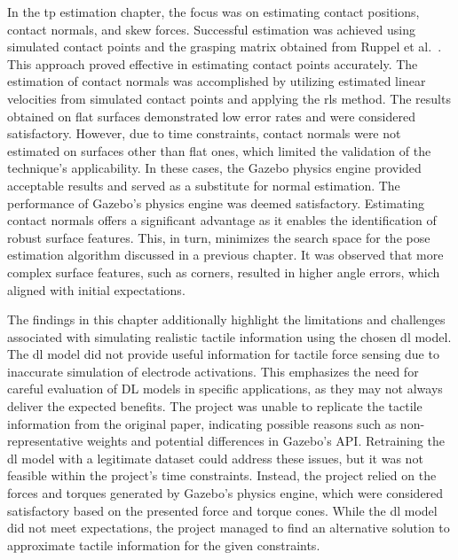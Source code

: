 In the \gls{tp} estimation chapter, the focus was on estimating contact positions, contact normals, and skew forces. Successful estimation was achieved using simulated contact points and the grasping matrix obtained from Ruppel et al.~\cite{simulation-of-the-syntouch-biotac-sensor}. This approach proved effective in estimating contact points accurately. The estimation of contact normals was accomplished by utilizing estimated linear velocities from simulated contact points and applying the \gls{rls} method. The results obtained on flat surfaces demonstrated low error rates and were considered satisfactory. However, due to time constraints, contact normals were not estimated on surfaces other than flat ones, which limited the validation of the technique's applicability. In these cases, the Gazebo physics engine provided acceptable results and served as a substitute for normal estimation. The performance of Gazebo's physics engine was deemed satisfactory. Estimating contact normals offers a significant advantage as it enables the identification of robust surface features. This, in turn, minimizes the search space for the pose estimation algorithm discussed in a previous chapter. It was observed that more complex surface features, such as corners, resulted in higher angle errors, which aligned with initial expectations. \medskip

The findings in this chapter additionally highlight the limitations and challenges associated with simulating realistic tactile information using the chosen \gls{dl} model. The \gls{dl} model did not provide useful information for tactile force sensing due to inaccurate simulation of electrode activations. This emphasizes the need for careful evaluation of DL models in specific applications, as they may not always deliver the expected benefits. The project was unable to replicate the tactile information from the original paper, indicating possible reasons such as non-representative weights and potential differences in Gazebo's API. Retraining the \gls{dl} model with a legitimate dataset could address these issues, but it was not feasible within the project's time constraints. Instead, the project relied on the forces and torques generated by Gazebo's physics engine, which were considered satisfactory based on the presented force and torque cones. While the \gls{dl} model did not meet expectations, the project managed to find an alternative solution to approximate tactile information for the given constraints. \medskip

